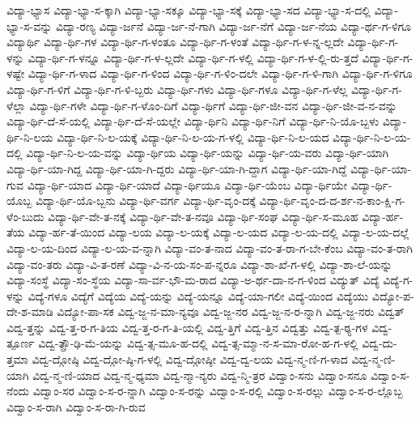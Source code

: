 {ವಿದ್ಯಾ-ಭ್ಯಾಸ
ವಿದ್ಯಾ-ಭ್ಯಾ-ಸ-ಕ್ಕಾಗಿ
ವಿದ್ಯಾ-ಭ್ಯಾ-ಸಕ್ಕೂ
ವಿದ್ಯಾ-ಭ್ಯಾ-ಸಕ್ಕೆ
ವಿದ್ಯಾ-ಭ್ಯಾ-ಸದ
ವಿದ್ಯಾ-ಭ್ಯಾ-ಸ-ದಲ್ಲಿ
ವಿದ್ಯಾ-ಭ್ಯಾ-ಸ-ವನ್ನು
ವಿದ್ಯಾ-ರಣ್ಯ
ವಿದ್ಯಾ-ರ್ಜನೆ
ವಿದ್ಯಾ-ರ್ಜ-ನೆ-ಗಾಗಿ
ವಿದ್ಯಾ-ರ್ಜ-ನೆಗೆ
ವಿದ್ಯಾ-ರ್ಜ-ನೆಯ
ವಿದ್ಯಾ-ರ್ಥ-ಗ-ಳಿಗೂ
ವಿದ್ಯಾರ್ಥಿ
ವಿದ್ಯಾ-ರ್ಥಿ-ಗಳ
ವಿದ್ಯಾ-ರ್ಥಿ-ಗ-ಳಂತೂ
ವಿದ್ಯಾ-ರ್ಥಿ-ಗ-ಳಂತೆ
ವಿದ್ಯಾ-ರ್ಥಿ-ಗ-ಳ-ನ್ನ-ಲ್ಲದೇ
ವಿದ್ಯಾ-ರ್ಥಿ-ಗ-ಳನ್ನು
ವಿದ್ಯಾ-ರ್ಥಿ-ಗ-ಳನ್ನೂ
ವಿದ್ಯಾ-ರ್ಥಿ-ಗ-ಳ-ಲ್ಲದೇ
ವಿದ್ಯಾ-ರ್ಥಿ-ಗ-ಳಲ್ಲಿ
ವಿದ್ಯಾ-ರ್ಥಿ-ಗ-ಳ-ಲ್ಲಿ-ರು-ತ್ತದೆ
ವಿದ್ಯಾ-ರ್ಥಿ-ಗ-ಳಷ್ಟೇ
ವಿದ್ಯಾ-ರ್ಥಿ-ಗ-ಳಾದ
ವಿದ್ಯಾ-ರ್ಥಿ-ಗ-ಳಿಂದ
ವಿದ್ಯಾ-ರ್ಥಿ-ಗ-ಳಿಂ-ದಲೇ
ವಿದ್ಯಾ-ರ್ಥಿ-ಗ-ಳಿ-ಗಾಗಿ
ವಿದ್ಯಾ-ರ್ಥಿ-ಗ-ಳಿಗೂ
ವಿದ್ಯಾ-ರ್ಥಿ-ಗ-ಳಿಗೆ
ವಿದ್ಯಾ-ರ್ಥಿ-ಗ-ಳಿ-ಬ್ಬರು
ವಿದ್ಯಾ-ರ್ಥಿ-ಗಳು
ವಿದ್ಯಾ-ರ್ಥಿ-ಗಳೂ
ವಿದ್ಯಾ-ರ್ಥಿ-ಗ-ಳೆಲ್ಲ
ವಿದ್ಯಾ-ರ್ಥಿ-ಗ-ಳೆಲ್ಲಾ
ವಿದ್ಯಾ-ರ್ಥಿ-ಗಳೇ
ವಿದ್ಯಾ-ರ್ಥಿ-ಗ-ಳೊಂ-ದಿಗೆ
ವಿದ್ಯಾ-ರ್ಥಿಗೆ
ವಿದ್ಯಾ-ರ್ಥಿ-ಜೀ-ವನ
ವಿದ್ಯಾ-ರ್ಥಿ-ಜೀ-ವ-ನ-ವನ್ನು
ವಿದ್ಯಾ-ರ್ಥಿ-ದೆ-ಸೆ-ಯಲ್ಲಿ
ವಿದ್ಯಾ-ರ್ಥಿ-ದೆ-ಸೆ-ಯಲ್ಲೇ
ವಿದ್ಯಾ-ರ್ಥಿನಿ
ವಿದ್ಯಾ-ರ್ಥಿ-ನಿಗೆ
ವಿದ್ಯಾ-ರ್ಥಿ-ನಿ-ಯೊ-ಬ್ಬಳು
ವಿದ್ಯಾ-ರ್ಥಿ-ನಿ-ಲಯ
ವಿದ್ಯಾ-ರ್ಥಿ-ನಿ-ಲ-ಯಕ್ಕೆ
ವಿದ್ಯಾ-ರ್ಥಿ-ನಿ-ಲ-ಯ-ಗ-ಳಲ್ಲಿ
ವಿದ್ಯಾ-ರ್ಥಿ-ನಿ-ಲ-ಯದ
ವಿದ್ಯಾ-ರ್ಥಿ-ನಿ-ಲ-ಯ-ದಲ್ಲಿ
ವಿದ್ಯಾ-ರ್ಥಿ-ನಿ-ಲ-ಯ-ವನ್ನು
ವಿದ್ಯಾ-ರ್ಥಿಯ
ವಿದ್ಯಾ-ರ್ಥಿ-ಯನ್ನು
ವಿದ್ಯಾ-ರ್ಥಿ-ಯ-ವರು
ವಿದ್ಯಾ-ರ್ಥಿ-ಯಾಗಿ
ವಿದ್ಯಾ-ರ್ಥಿ-ಯಾ-ಗಿದ್ದ
ವಿದ್ಯಾ-ರ್ಥಿ-ಯಾ-ಗಿ-ದ್ದರು
ವಿದ್ಯಾ-ರ್ಥಿ-ಯಾ-ಗಿ-ದ್ದಾಗ
ವಿದ್ಯಾ-ರ್ಥಿ-ಯಾ-ಗಿದ್ದೆ
ವಿದ್ಯಾ-ರ್ಥಿ-ಯಾ-ಗುವ
ವಿದ್ಯಾ-ರ್ಥಿ-ಯಾದ
ವಿದ್ಯಾ-ರ್ಥಿ-ಯಾದೆ
ವಿದ್ಯಾ-ರ್ಥಿಯೂ
ವಿದ್ಯಾ-ರ್ಥಿ-ಯೆಂಬ
ವಿದ್ಯಾ-ರ್ಥಿಯೇ
ವಿದ್ಯಾ-ರ್ಥಿ-ಯೊಬ್ಬ
ವಿದ್ಯಾ-ರ್ಥಿ-ಯೊ-ಬ್ಬನು
ವಿದ್ಯಾ-ರ್ಥಿ-ವರ್ಗ
ವಿದ್ಯಾ-ರ್ಥಿ-ವೃಂ-ದಕ್ಕೆ
ವಿದ್ಯಾ-ರ್ಥಿ-ವೃಂ-ದ-ದ-ರ್ಶ-ನ-ಕಾಂ-ಕ್ಷಿ-ಗ-ಳೆಂ-ಬುದು
ವಿದ್ಯಾ-ರ್ಥಿ-ವೇ-ತ-ನಕ್ಕೆ
ವಿದ್ಯಾ-ರ್ಥಿ-ವೇ-ತ-ನವೂ
ವಿದ್ಯಾ-ರ್ಥಿ-ಸಂಘ
ವಿದ್ಯಾ-ರ್ಥಿ-ಸ-ಮೂಹ
ವಿದ್ಯಾ-ರ್ಹ-ತೆಯ
ವಿದ್ಯಾ-ರ್ಹ-ತೆ-ಯಿಂದ
ವಿದ್ಯಾ-ಲಯ
ವಿದ್ಯಾ-ಲ-ಯಕ್ಕೆ
ವಿದ್ಯಾ-ಲ-ಯದ
ವಿದ್ಯಾ-ಲ-ಯ-ದಲ್ಲಿ
ವಿದ್ಯಾ-ಲ-ಯ-ದಲ್ಲೆ
ವಿದ್ಯಾ-ಲ-ಯ-ದಿಂದ
ವಿದ್ಯಾ-ಲ-ಯ-ವ-ನ್ನಾಗಿ
ವಿದ್ಯಾ-ವಂ-ತ-ನಾದ
ವಿದ್ಯಾ-ವಂ-ತ-ರಾ-ಗ-ಬೇ-ಕೆಂಬ
ವಿದ್ಯಾ-ವಂ-ತ-ರಾಗಿ
ವಿದ್ಯಾ-ವಂ-ತರು
ವಿದ್ಯಾ-ವಿ-ತ-ರಣೆ
ವಿದ್ಯಾ-ವಿ-ನ-ಯ-ಸಂ-ಪ-ನ್ನರೂ
ವಿದ್ಯಾ-ಶಾ-ಖೆ-ಗ-ಳಲ್ಲಿ
ವಿದ್ಯಾ-ಶಾ-ಲೆ-ಯನ್ನು
ವಿದ್ಯಾ-ಸಂಸ್ಥೆ
ವಿದ್ಯಾ-ಸಂ-ಸ್ಥೆಯ
ವಿದ್ಯಾ-ಸಾ-ರ್ವ-ಭೌ-ಮ-ರಾದ
ವಿದ್ಯಾ-ಅ-ರ್ಥ-ದಾ-ನ-ಗ-ಳಿಂದ
ವಿದ್ಯುತ್
ವಿದ್ಯೆ
ವಿದ್ಯೆ-ಗ-ಳನ್ನು
ವಿದ್ಯೆ-ಗಳೂ
ವಿದ್ಯೆಗೆ
ವಿದ್ಯೆಯ
ವಿದ್ಯೆ-ಯನ್ನು
ವಿದ್ಯೆ-ಯನ್ನೂ
ವಿದ್ಯೆ-ಯಾ-ಗಲೀ
ವಿದ್ಯೆ-ಯಿಂದ
ವಿದ್ಯೆಯು
ವಿದ್ಯೋ-ಪ-ದೇ-ಶ-ಮಾಡಿ
ವಿದ್ಯೋ-ಪಾ-ಸಕ
ವಿದ್ವ-ಜ್ಜ-ನ-ಮಾ-ನ್ಯವೂ
ವಿದ್ವ-ಜ್ಜ-ನರ
ವಿದ್ವ-ಜ್ಜ-ನ-ರ-ನ್ನಾಗಿ
ವಿದ್ವ-ಜ್ಜ-ನರು
ವಿದ್ವತ್
ವಿದ್ವ-ತ್ತನ್ನು
ವಿದ್ವ-ತ್ತ-ರ-ಗ-ತಿಯ
ವಿದ್ವ-ತ್ತ-ರ-ಗ-ತಿ-ಯಲ್ಲಿ
ವಿದ್ವ-ತ್ತಿಗೆ
ವಿದ್ವ-ತ್ತಿನ
ವಿದ್ವತ್ತು
ವಿದ್ವ-ತ್ಪ-ಠ್ಯ-ಗಳ
ವಿದ್ವ-ತ್ಪೂರ್ಣ
ವಿದ್ವ-ತ್ಪ್ರೌ-ಢಿ-ಮೆ-ಯನ್ನು
ವಿದ್ವ-ತ್ಸ-ಮೂ-ಹ-ದಲ್ಲಿ
ವಿದ್ವ-ತ್ಸ-ಮ್ಮಾ-ನ-ಸ-ಮಾ-ರೋ-ಹ-ಗ-ಳಲ್ಲಿ
ವಿದ್ವ-ದು-ತ್ತಮಾ
ವಿದ್ವ-ದ್ಗೋಷ್ಠಿ
ವಿದ್ವ-ದ್ಗೋ-ಷ್ಠಿ-ಗ-ಳಲ್ಲಿ
ವಿದ್ವ-ದ್ಗೋಷ್ಠೀ
ವಿದ್ವ-ದ್ವ-ಲಯ
ವಿದ್ವ-ನ್ಮ-ಣಿ-ಗ-ಳಾದ
ವಿದ್ವ-ನ್ಮ-ಣಿ-ಯಾಗಿ
ವಿದ್ವ-ನ್ಮ-ಣಿ-ಯಾದ
ವಿದ್ವ-ನ್ಮ-ಧ್ಯಮಾ
ವಿದ್ವ-ನ್ಮಾ-ನ್ಯರು
ವಿದ್ವ-ನ್ಮಿ-ತ್ರರ
ವಿದ್ವಾಂ-ಸನು
ವಿದ್ವಾಂ-ಸನೂ
ವಿದ್ವಾಂ-ಸ-ನೆಂದು
ವಿದ್ವಾಂ-ಸರ
ವಿದ್ವಾಂ-ಸ-ರ-ನ್ನಾಗಿ
ವಿದ್ವಾಂ-ಸ-ರನ್ನು
ವಿದ್ವಾಂ-ಸ-ರಲ್ಲಿ
ವಿದ್ವಾಂ-ಸ-ರಲ್ಲು
ವಿದ್ವಾಂ-ಸ-ರ-ಲ್ಲೊಬ್ಬ
ವಿದ್ವಾಂ-ಸ-ರಾಗಿ
ವಿದ್ವಾಂ-ಸ-ರಾ-ಗಿ-ರುವ
}
